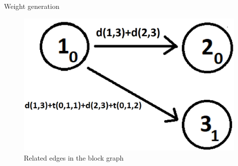 \begin{frame}[allowframebreaks]{Weight generation}
\begin{itemize}
\begin{multicols}{2}
        \begin{figure}[h]
        \centering
    \includegraphics[width=0.6\linewidth]{Img/butcher/1_2_block_edge.PNG}
    \caption{Related edges in the block graph}
    \end{figure}
    \end{multicols}
    
    \end{itemize}
    
\end{frame}